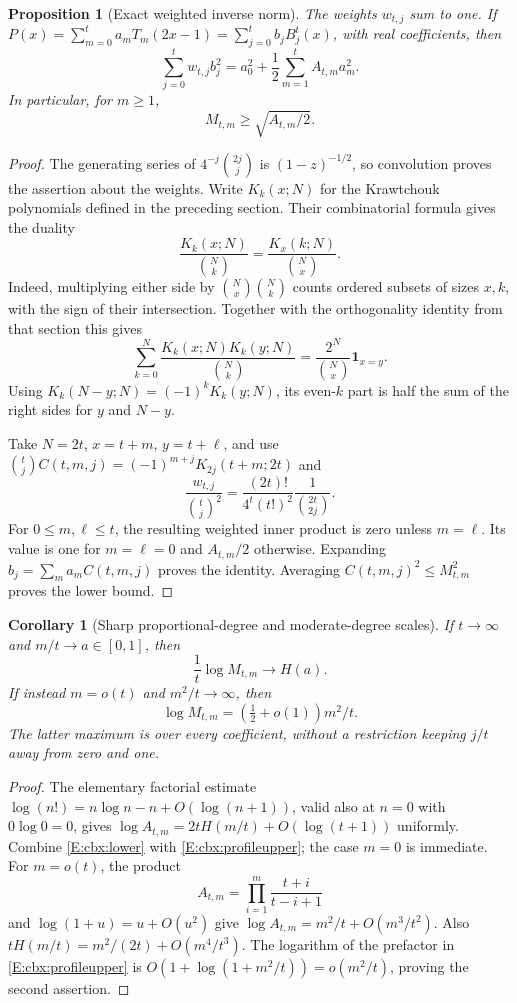 \documentclass[11pt,a4paper]{article}
\newtheorem{proposition}[theorem]{Proposition}
\newtheorem{corollary}[theorem]{Corollary}
\theoremstyle{definition}
\theoremstyle{remark}
\numberwithin{equation}{section}
\begin{document}
\begin{proposition}[Exact weighted inverse norm]\label{E:cbx:parseval}
The weights $w_{t,j}$ sum to one. If
$P(x)=\sum_{m=0}^t a_mT_m(2x-1)=\sum_{j=0}^t b_jB_j^t(x)$, with
real coefficients, then
\[
 \sum_{j=0}^t w_{t,j}b_j^2
       =a_0^2+\frac12\sum_{m=1}^t A_{t,m}a_m^2.
\]
In particular, for $m\ge1$,
\begin{equation}\label{E:cbx:lower}
                      M_{t,m}\ge\sqrt{A_{t,m}/2}.
\end{equation}
\end{proposition}
\begin{proof}
The generating series of $4^{-j}\binom{2j}{j}$ is
$(1-z)^{-1/2}$, so convolution proves the assertion about the weights.
Write $K_k(x;N)$ for the Krawtchouk polynomials defined in the preceding
section. Their combinatorial formula gives the duality
\[
 \frac{K_k(x;N)}{\binom Nk}=
 \frac{K_x(k;N)}{\binom Nx}.
\]
Indeed, multiplying either side by $\binom Nx\binom Nk$ counts
ordered subsets of sizes $x,k$, with the sign of their intersection.
Together with the orthogonality identity from that section this gives
\[
 \sum_{k=0}^N\frac{K_k(x;N)K_k(y;N)}{\binom Nk}
                   =\frac{2^N}{\binom Nx}\mathbf1_{x=y}.
\]
Using $K_k(N-y;N)=(-1)^kK_k(y;N)$, its even-$k$ part is half the
sum of the right sides for $y$ and $N-y$.

Take $N=2t$, $x=t+m$, $y=t+\ell$, and use
$\binom tjC(t,m,j)=(-1)^{m+j}K_{2j}(t+m;2t)$ and
\[
 \frac{w_{t,j}}{\binom tj^2}
      =\frac{(2t)!}{4^t(t!)^2}\frac1{\binom{2t}{2j}}.
\]
For $0\le m,\ell\le t$, the resulting weighted inner product is
zero unless $m=\ell$. Its value is one for $m=\ell=0$ and
$A_{t,m}/2$ otherwise. Expanding $b_j=\sum_m a_mC(t,m,j)$ proves
the identity. Averaging $C(t,m,j)^2\le M_{t,m}^2$ proves the lower bound.
\end{proof}

\begin{corollary}[Sharp proportional-degree and moderate-degree scales]
\label{E:cbx:asymptotic}
If $t\to\infty$ and $m/t\to a\in[0,1]$, then
\[
                    \frac1t\log M_{t,m}\longrightarrow H(a).
\]
If instead $m=o(t)$ and $m^2/t\to\infty$, then
\[
                    \log M_{t,m}=(\tfrac12+o(1))m^2/t.
\]
The latter maximum is over every coefficient, without a restriction
keeping $j/t$ away from zero and one.
\end{corollary}
\begin{proof}
The elementary factorial estimate
$\log(n!)=n\log n-n+O(\log(n+1))$, valid also at $n=0$ with
$0\log0=0$, gives
$\log A_{t,m}=2tH(m/t)+O(\log(t+1))$ uniformly.
Combine \eqref{E:cbx:lower} with \eqref{E:cbx:profileupper}; the case
$m=0$ is immediate. For $m=o(t)$, the product
\[
 A_{t,m}=\prod_{i=1}^m\frac{t+i}{t-i+1}
\]
and $\log(1+u)=u+O(u^2)$ give
$\log A_{t,m}=m^2/t+O(m^3/t^2)$.
Also $tH(m/t)=m^2/(2t)+O(m^4/t^3)$.
The logarithm of the prefactor in \eqref{E:cbx:profileupper} is
$O(1+\log(1+m^2/t))=o(m^2/t)$, proving the second assertion.
\end{proof}
\end{document}
